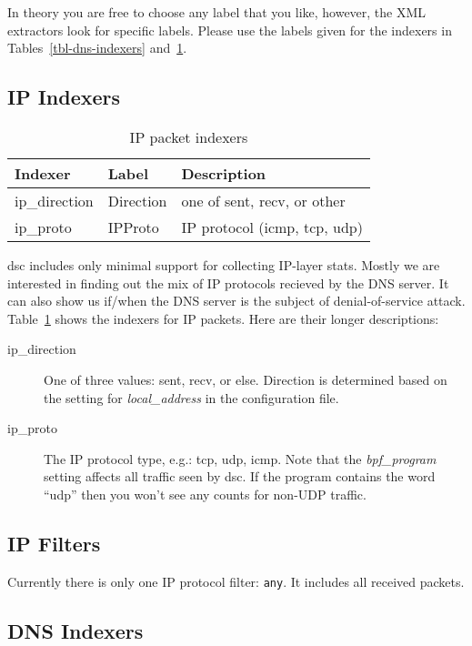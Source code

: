 \documentclass{report}
\def\dsc{{\sc dsc}}
\begin{document}
In theory you are free to choose any label that you like, however,
the XML extractors look for specific labels.  Please use the labels
given for the indexers in Tables~\ref{tbl-dns-indexers}
and~\ref{tbl-ip-indexers}.

\subsection{IP Indexers}

\begin{table}
\begin{center}
\begin{tabular}{|lll|}
\hline
Indexer & Label & Description \\
\hline 
ip\_direction & Direction & one of sent, recv, or other \\
ip\_proto & IPProto & IP protocol (icmp, tcp, udp) \\
\hline
\end{tabular}
\caption{\label{tbl-ip-indexers}IP packet indexers}
\end{center}
\end{table}

{\dsc} includes only minimal support for collecting IP-layer
stats.  Mostly we are interested in finding out the mix of
IP protocols recieved by the DNS server.  It can also show us
if/when the DNS server is the subject of denial-of-service
attack.
Table~\ref{tbl-ip-indexers} shows the indexers for IP packets.
Here are their longer descriptions:

\begin{description}
\item[ip\_direction]
	One of three values: sent, recv, or else.  Direction is determined
	based on the setting for {\em local\_address\/} in the configuration file.
\item[ip\_proto]
	The IP protocol type, e.g.: tcp, udp, icmp.
	Note that the {\em bpf\_program\/} setting affects all traffic
	seen by {\dsc}.  If the program contains the word ``udp''
	then you won't see any counts for non-UDP traffic.
\end{description}

\subsection{IP Filters}

Currently there is only one IP protocol filter: {\tt any\/}.
It includes all received packets.


\subsection{DNS Indexers}
\end{document}
